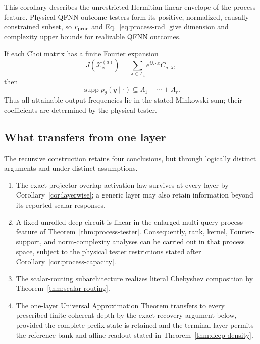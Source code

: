 \documentclass[pdflatex,sn-mathphys,NameDate,iicol]{sn-jnl}
\newcommand{\supp}{\operatorname{supp}}
\newcommand{\cX}{\mathcal{X}}
\begin{document}
This corollary describes the unrestricted Hermitian linear envelope of the
process feature. Physical QFNN outcome testers form its positive, normalized,
causally constrained subset, so $r_{\rm proc}$ and
Eq.~\eqref{eq:process-rad} give dimension and complexity upper bounds for
realizable QFNN outcomes.

If each Choi matrix has a finite Fourier expansion
\begin{equation}
 J(\cX_x^{(a)})
 =\sum_{\lambda\in\Lambda_a}e^{i\lambda\cdot x}C_{a,\lambda},
\end{equation}
then
\begin{equation}
 \supp p_\theta(y\mid\cdot)
 \subseteq\Lambda_1+\cdots+\Lambda_r.
 \label{eq:process-fourier-support}
\end{equation}
Thus all attainable output frequencies lie in the stated Minkowski sum; their
coefficients are determined by the physical tester.

\subsection{What transfers from one layer}
\label{sec:deep-transfer-summary}

The recursive construction retains four conclusions, but through logically
distinct arguments and under distinct assumptions.

\begin{enumerate}[leftmargin=1.5em]
 \item The exact projector-overlap activation law survives at every layer by
 Corollary~\ref{cor:layerwise}; a generic layer may also retain information
 beyond its reported scalar responses.

 \item A fixed unrolled deep circuit is linear in the enlarged multi-query
 process feature of Theorem~\ref{thm:process-tester}. Consequently, rank,
 kernel, Fourier-support, and norm-complexity analyses can be carried out in
 that process space, subject to the physical tester restrictions stated after
 Corollary~\ref{cor:process-capacity}.

 \item The scalar-routing subarchitecture realizes literal Chebyshev
 composition by Theorem~\ref{thm:scalar-routing}.

 \item The one-layer Universal Approximation Theorem transfers to every
 prescribed finite coherent depth by the exact-recovery argument below,
 provided the complete prefix state is retained and the terminal layer permits
 the reference bank and affine readout stated in
 Theorem~\ref{thm:deep-density}.
\end{enumerate}
\end{document}
